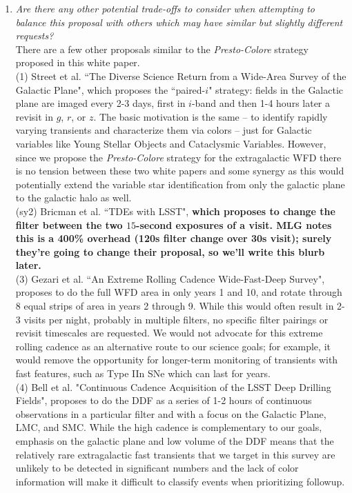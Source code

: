 \documentclass[12pt, letterpaper]{article}
\begin{document}
\begin{enumerate}
    \item {\footnotesize {\it Are there any other potential trade-offs to consider when attempting to balance this proposal with others which may have similar but slightly different requests?}} \\ There are a few other proposals similar to the {\em Presto-Colore} strategy proposed in this white paper. \\ (1) Street et al. ``The Diverse Science Return from a Wide-Area Survey of the Galactic Plane", which proposes the ``paired-$i$" strategy: fields in the Galactic plane are imaged every 2-3 days, first in $i$-band and then 1-4 hours later a revisit in $g$, $r$, or $z$. The basic motivation is the same -- to identify rapidly varying transients and characterize them via colors -- just for Galactic variables like Young Stellar Objects and Cataclysmic Variables. However, since we propose the {\em Presto-Colore} strategy for the extragalactic WFD there is no tension between these two white papers and some synergy as this would potentially extend the variable star identification from only the galactic plane to the galactic halo as well. \\ (sy2) Bricman et al. ``TDEs with LSST", {\bf which proposes to change the filter between the two $15$-second exposures of a visit. MLG notes this is a 400\% overhead (120s filter change over 30s visit); surely they're going to change their proposal, so we'll write this blurb later.} \\ (3) Gezari et al. ``An Extreme Rolling Cadence Wide-Fast-Deep Survey", proposes to do the full WFD area in only years 1 and 10, and rotate through 8 equal strips of area in years 2 through 9. While this would often result in 2-3 visits per night, probably in multiple filters, no specific filter pairings or revisit timescales are requested. We would not advocate for this extreme rolling cadence as an alternative route to our science goals; for example, it would remove the opportunity for longer-term monitoring of transients with fast features, such as Type IIn SNe which can last for years.  \\ (4) Bell et al. "Continuous Cadence Acquisition of the LSST Deep Drilling Fields", proposes to do the DDF as a series of 1-2 hours of continuous observations in a particular filter and with a focus on the Galactic Plane, LMC, and SMC.  While the high cadence is complementary to our goals, emphasis on the galactic plane and low volume of the DDF means that the relatively rare extragalactic fast transients that we target in this survey are unlikely to be detected in significant numbers and the lack of color information will make it difficult to classify events when prioritizing followup.  
\end{enumerate}
\end{document}
